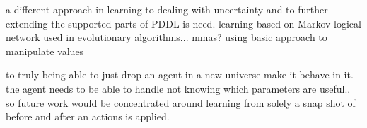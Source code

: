 	a different approach  in learning to dealing with uncertainty and to further extending the supported parts of PDDL is need. learning based on Markov logical network used in \cite{zhuo2010a} 
	 evolutionary algorithms... mmas? using basic approach to manipulate values
	
	
 to truly being able to just drop an agent in a new universe make it behave in it. the agent needs to be able to handle not knowing which parameters are useful.. so future work would be concentrated around learning from solely a snap shot of before and after an actions is applied. 

	
	